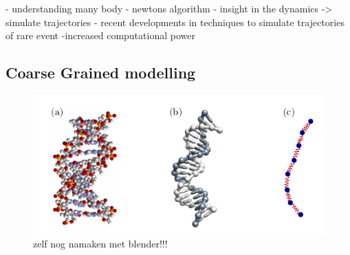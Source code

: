 %

- understanding many body - newtons algorithm
- insight in the dynamics -> simulate trajectories
- recent developments in techniques to simulate trajectories of rare event
-increased computational power
\subsection{Coarse Grained modelling}
\begin{figure}[htpb]
    \centering
    \includegraphics[width=0.8\linewidth]{Figures/CoarseGrained.png}
    \caption{zelf nog namaken met blender!!!}%
    \label{fig:Figures/CoarseGrained}
\end{figure}

